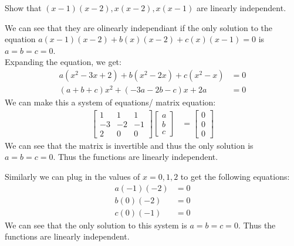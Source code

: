 \documentclass[answers,12pt,addpoints]{exam}
\begin{document}
\begin{example}
    Show that $(x-1)(x-2), x(x-2), x(x-1)$ are linearly independent.\\
    \begin{solution}
        We can see that they are olinearly independiant if the only solution to the equation $a(x-1)(x-2) + b(x)(x-2) + c(x)(x-1) = 0$ is $a = b = c = 0$.\\
        Expanding the equation, we get:
        \begin{align*}
            a(x^2 - 3x + 2) + b(x^2 - 2x) + c(x^2 - x) &= 0\\
            (a + b + c)x^2 + (-3a - 2b - c)x + 2a &= 0
        \end{align*}
        We can make this a system of equations/ matrix equation:
        \begin{align*}
            \begin{bmatrix}
                1 & 1 & 1\\
                -3 & -2 & -1\\
                2 & 0 & 0
            \end{bmatrix}
            \begin{bmatrix}
                a\\
                b\\
                c
            \end{bmatrix}
            &=
            \begin{bmatrix}
                0\\
                0\\
                0
            \end{bmatrix}
        \end{align*}
        We can see that the matrix is invertible and thus the only solution is $a = b = c = 0$. Thus the functions are linearly independent.
    \end{solution}
    \begin{solution}
        Similarly we can plug in the values of $x = 0,1,2$ to get the following equations:
        \begin{align*}
            a(-1)(-2) &= 0\\
            b(0)(-2) &= 0\\
            c(0)(-1) &= 0
        \end{align*}
        We can see that the only solution to this system is $a = b = c = 0$. Thus the functions are linearly independent.
    \end{solution}
\end{example}
\end{document}

